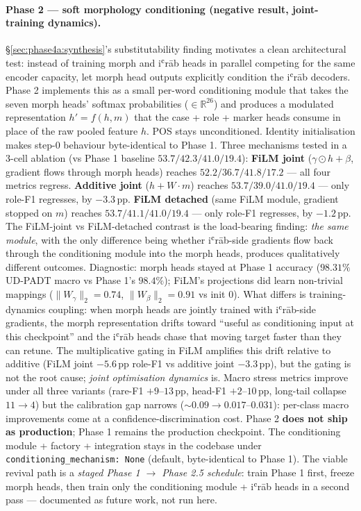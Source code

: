 \documentclass[10pt,a4paper,twocolumn]{article}
\begin{document}
\paragraph{Phase 2 --- soft morphology conditioning (negative result, joint-training dynamics).}
\label{sec:phase2}
\S\ref{sec:phase4a:synthesis}'s substitutability finding motivates a clean architectural test: instead of training morph and iʿrāb heads in parallel competing for the same encoder capacity, let morph head outputs explicitly condition the iʿrāb decoders. Phase 2 implements this as a small per-word conditioning module that takes the seven morph heads' softmax probabilities ($\in \mathbb{R}^{26}$) and produces a modulated representation $h' = f(h, m)$ that the case + role + marker heads consume in place of the raw pooled feature $h$. POS stays unconditioned. Identity initialisation makes step-0 behaviour byte-identical to Phase 1. Three mechanisms tested in a 3-cell ablation (vs Phase 1 baseline $53.7 / 42.3 / 41.0 / 19.4$): \textbf{FiLM joint} ($\gamma \odot h + \beta$, gradient flows through morph heads) reaches $52.2 / 36.7 / 41.8 / 17.2$ --- all four metrics regress. \textbf{Additive joint} ($h + W \cdot m$) reaches $53.7 / 39.0 / 41.0 / \mathbf{19.4}$ --- only role-F1 regresses, by $-3.3$\,pp. \textbf{FiLM detached} (same FiLM module, gradient stopped on $m$) reaches $\mathbf{53.7} / 41.1 / 41.0 / \mathbf{19.4}$ --- only role-F1 regresses, by $-1.2$\,pp. The FiLM-joint vs FiLM-detached contrast is the load-bearing finding: \emph{the same module}, with the only difference being whether iʿrāb-side gradients flow back through the conditioning module into the morph heads, produces qualitatively different outcomes. Diagnostic: morph heads stayed at Phase 1 accuracy ($98.31\%$ UD-PADT macro vs Phase 1's $98.4\%$); FiLM's projections did learn non-trivial mappings ($\|W_\gamma\|_2 = 0.74$, $\|W_\beta\|_2 = 0.91$ vs init $0$). What differs is training-dynamics coupling: when morph heads are jointly trained with iʿrāb-side gradients, the morph representation drifts toward ``useful as conditioning input at this checkpoint'' and the iʿrāb heads chase that moving target faster than they can retune. The multiplicative gating in FiLM amplifies this drift relative to additive (FiLM joint $-5.6$\,pp role-F1 vs additive joint $-3.3$\,pp), but the gating is not the root cause; \emph{joint optimisation dynamics} is. Macro stress metrics improve under all three variants (rare-F1 $+9$--$13$\,pp, head-F1 $+2$--$10$\,pp, long-tail collapse $11 \rightarrow 4$) but the calibration gap narrows ($\sim$$0.09 \rightarrow 0.017$--$0.031$): per-class macro improvements come at a confidence-discrimination cost. Phase 2 \textbf{does not ship as production}; Phase 1 remains the production checkpoint. The conditioning module + factory + integration stays in the codebase under \texttt{conditioning\_mechanism: None} (default, byte-identical to Phase 1). The viable revival path is a \emph{staged Phase 1 $\rightarrow$ Phase 2.5 schedule}: train Phase 1 first, freeze morph heads, then train only the conditioning module + iʿrāb heads in a second pass --- documented as future work, not run here.
\end{document}
